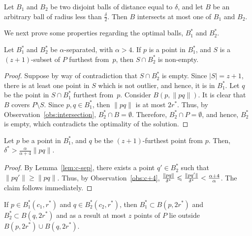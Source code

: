 \documentclass[envcountsame]{cls/cccg15}
\newcommand{\card}[1]{\left|{#1}\right|}
\newcommand{\len}[1]{\|{#1}\|}
\newcommand{\lee}{\leqslant}
\newcommand{\gee}{\geqslant}
\renewcommand{\le}{\lee}
\renewcommand{\ge}{\gee}
\begin{document}
\begin{obs}
\label{obs:intersection}
	Let $B_1$ and $B_2$ be two disjoint balls of distance equal to $\delta$,
	and let $B$ be an arbitrary ball of radius less than $\frac{\delta}{2}$. 
	Then $B$ intersects at most one of $B_1$ and $B_2$.
\end{obs}

\noindent 
We next prove some properties regarding 
the optimal balls, $B_1^*$ and $B_2^*$.

\begin{lemma}
\label{lem:c-sep}
	Let $B_1^*$ and $B_2^*$ be $\alpha$-separated, with $\alpha > 4$.
	If $p$ is a point in $B_1^*$,
	and $S$ is a $(z+1)$-subset of $P$ furthest from~$p$,
	then $S \cap B_2^*$ is non-empty.
\end{lemma}

\begin{proof}
Suppose by way of contradiction that $S \cap B_2^*$ is empty. 
Since $\card{S} = z + 1$, there is at least one point in $S$
which is not outlier, and hence, it is in $B_1^*$.
Let $q$ be the point in $S \cap B_1^*$ furthest from~$p$. 
Consider $B(p, \len{pq})$. It is clear that $B$ covers $P \setminus S$. 
Since $p, q \in B_1^*$, then $\len{pq}$ is at most $2r^*$. 
Thus, by Observation~\ref{obs:intersection}, $B_2^* \cap B = \emptyset$. 
Therefore, $B_2^* \cap P = \emptyset$, and hence,
 $B_2^*$ is empty, which contradicts the optimality of the solution.
\end{proof}

\begin{lemma}
\label{lem:(z+1)-furthest}
	Let $p$ be a point in $B_1^{*}$,
	and $q$ be the $(z+1)$-furthest point from $p$. 
	Then, $\delta^* > \frac{\alpha}{\alpha+4}\len{pq}$.
\end{lemma}

\begin{proof}
By Lemma~\ref{lem:c-sep}, there exists a point $q' \in B_2^*$ 
such that $\len{pq'} \ge \len{pq}$. 
Thus, by Observation~\ref{obs:c+4}, 
${\len{pq} \over \delta^*} \le {\len{pq'} \over \delta^*} < \frac{\alpha+4}{\alpha}$.
The claim follows immediately.
\end{proof}

\begin{lemma}
\label{lem:2r}
	If $p \in B_1^*(c_1, r^*)$ and $q \in B_2^*(c_2, r^*)$,
	then $B_1^* \subset B(p, 2r^*)$ and $B_2^* \subset B(q, 2r^*)$ and as a result at most $z$ points of $P$ lie outside $B(p, 2r^*) \cup B(q, 2r^*)$.
\end{lemma}
\end{document}
